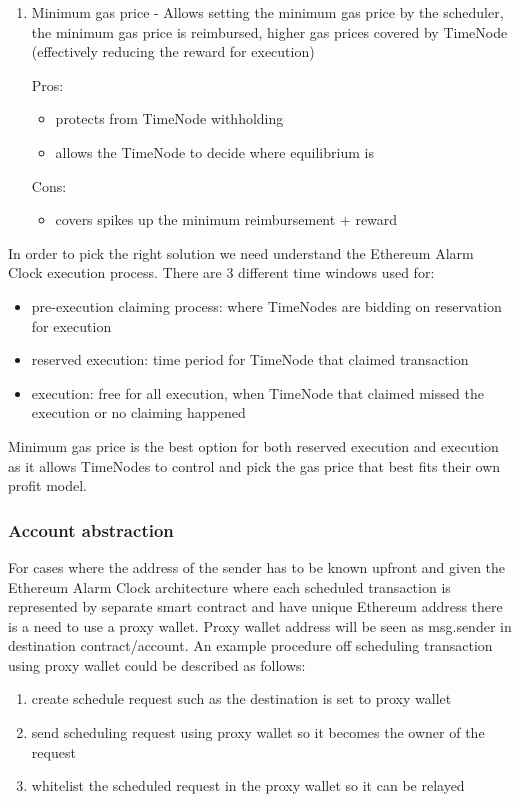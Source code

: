 \documentclass{article}
\begin{document}
{\begin{enumerate}
    \item 
      Minimum gas price - Allows setting the minimum gas price by the scheduler, the minimum gas price is reimbursed, higher gas prices covered by TimeNode (effectively reducing the reward for execution)

      Pros:
      \begin{itemize}
        \item protects from TimeNode withholding
        \item allows the TimeNode to decide where equilibrium is 
      \end{itemize}
      Cons:
      \begin{itemize}
        \item covers spikes up the minimum reimbursement + reward
      \end{itemize}
  \end{enumerate}

  In order to pick the right solution we need understand the Ethereum Alarm Clock execution process. There are 3 different time windows used for:
  \begin{itemize}
    \item pre-execution claiming process: where TimeNodes are bidding on reservation for execution
    \item reserved execution: time period for TimeNode that claimed transaction
    \item execution: free for all execution, when TimeNode that claimed missed the execution or no claiming happened
  \end{itemize}
  Minimum gas price is the best option for both reserved execution and execution as it allows TimeNodes to control and pick the gas price that best fits their own profit model.

  \subsubsection{Account abstraction}
  For cases where the address of the sender has to be known upfront and given the Ethereum Alarm Clock architecture where each scheduled transaction is represented by separate smart contract and have unique Ethereum address there is a need to use a proxy wallet.
  Proxy wallet address will be seen as msg.sender in destination contract/account. An example procedure off scheduling transaction using proxy wallet could be described as follows:
  \begin{enumerate}
    \item create schedule request such as the destination is set to proxy wallet
    \item send scheduling request using proxy wallet so it becomes the owner of the request
    \item whitelist the scheduled request in the proxy wallet so it can be relayed
  \end{enumerate}

}
\end{document}
